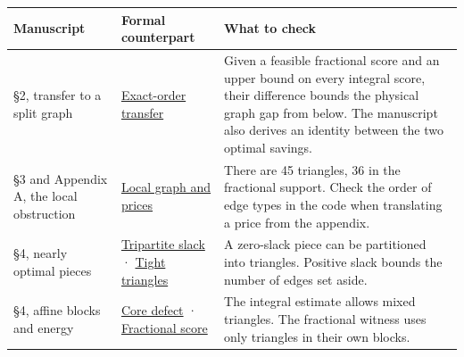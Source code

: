 \documentclass[english,11pt,a4paper]{article}
\newcounter{none}
\begin{document}
{\def\LTcaptype{none} %
\begin{longtable}[]{@{}
  >{\raggedright\arraybackslash}p{}
  >{\raggedright\arraybackslash}p{}
  >{\raggedright\arraybackslash}p{}@{}}
\toprule\noalign{}
\begin{minipage}[b]{\linewidth}\raggedright
Manuscript
\end{minipage} & \begin{minipage}[b]{\linewidth}\raggedright
Formal counterpart
\end{minipage} & \begin{minipage}[b]{\linewidth}\raggedright
What to check
\end{minipage} \\
\midrule\noalign{}
\endhead
\bottomrule\noalign{}
\endlastfoot
§2, transfer to a split graph & \href{https://github.com/jtraverso/split-clique-partition-gap/blob/ccb5444b2ecdff9de1d6221133633a25a224953d/R434/ExactGraphTransfer.lean}{Exact-order transfer} & Given a feasible fractional score and an upper bound on every integral score, their difference bounds the physical graph gap from below. The manuscript also derives an identity between the two optimal savings. \\
§3 and Appendix A, the local obstruction & \href{https://github.com/jtraverso/split-clique-partition-gap/blob/ccb5444b2ecdff9de1d6221133633a25a224953d/R434/LocalH54.lean}{Local graph and prices} & There are 45 triangles, 36 in the fractional support. Check the order of edge types in the code when translating a price from the appendix. \\
§4, nearly optimal pieces & \href{https://github.com/jtraverso/split-clique-partition-gap/blob/ccb5444b2ecdff9de1d6221133633a25a224953d/R434/TripartiteSlack.lean}{Tripartite slack} · \href{https://github.com/jtraverso/split-clique-partition-gap/blob/ccb5444b2ecdff9de1d6221133633a25a224953d/R434/TightTriangles.lean}{Tight triangles} & A zero-slack piece can be partitioned into triangles. Positive slack bounds the number of edges set aside. \\
§4, affine blocks and energy & \href{https://github.com/jtraverso/split-clique-partition-gap/blob/ccb5444b2ecdff9de1d6221133633a25a224953d/R434/CoreDefect.lean}{Core defect} · \href{https://github.com/jtraverso/split-clique-partition-gap/blob/ccb5444b2ecdff9de1d6221133633a25a224953d/R434/CoreFractional.lean}{Fractional score} & The integral estimate allows mixed triangles. The fractional witness uses only triangles in their own blocks. \\

\end{longtable}}
\end{document}
